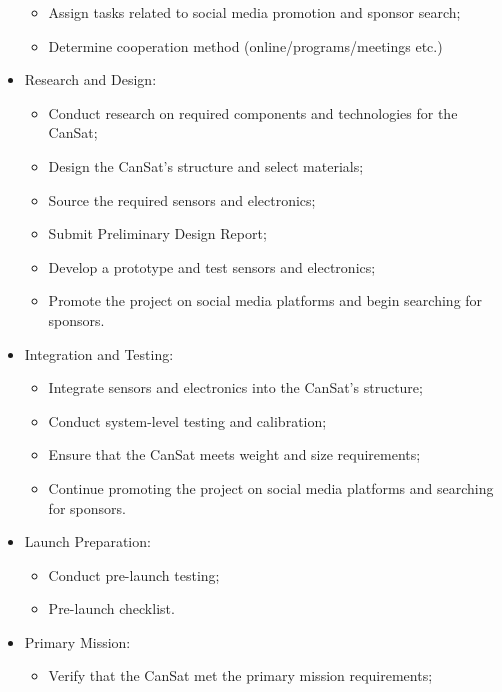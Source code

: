\documentclass[11pt]{article}
\begin{document}
\begin{itemize}[leftmargin=1cm, itemindent=0.25cm, noitemsep, topsep=0pt, label=$\bullet$]
    \begin{itemize}[label=, noitemsep, topsep=2pt]
        \item Assign tasks related to social media promotion and sponsor search;
        \item Determine cooperation method (online/programs/meetings etc.)
    \end{itemize}
    \item Research and Design:
    \begin{itemize}[label=, noitemsep, topsep=2pt]
        \item Conduct research on required components and technologies for the CanSat;
        \item Design the CanSat's structure and select materials;
        \item Source the required sensors and electronics;
        \item Submit Preliminary Design Report;
        \item Develop a prototype and test sensors and electronics;
        \item Promote the project on social media platforms and begin searching for sponsors.
    \end{itemize}
    \item Integration and Testing:
    \begin{itemize}[label=, noitemsep, topsep=2pt]
        \item Integrate sensors and electronics into the CanSat's structure;
        \item Conduct system-level testing and calibration;
        \item Ensure that the CanSat meets weight and size requirements;
        \item Continue promoting the project on social media platforms and searching for sponsors.
    \end{itemize}
    \item Launch Preparation:
    \begin{itemize}[label=, noitemsep, topsep=2pt]
        \item Conduct pre-launch testing;
        \item Pre-launch checklist.
    \end{itemize}
    \item Primary Mission:
    \begin{itemize}[label=, noitemsep, topsep=2pt]
        \item Verify that the CanSat met the primary mission requirements;

\end{itemize}
\end{itemize}
\end{document}
